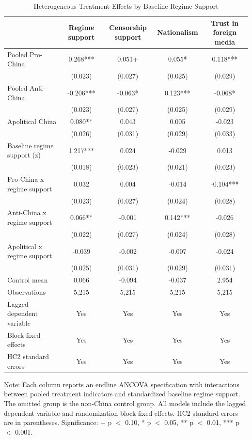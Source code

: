 \begin{table}[H]
\centering
\caption{Heterogeneous Treatment Effects by Baseline Regime Support}
\label{tab:het_rs_t1}
\footnotesize
\begin{threeparttable}
\begin{tabular}{lcccc}
\toprule
 & Regime support & Censorship support & Nationalism & Trust in foreign media \\
\midrule
Pooled Pro-China & 0.268*** & 0.051+ & 0.055* & 0.118*** \\
 & (0.023) & (0.027) & (0.025) & (0.029) \\
\addlinespace
Pooled Anti-China & -0.206*** & -0.063* & 0.123*** & -0.068* \\
 & (0.023) & (0.027) & (0.025) & (0.029) \\
\addlinespace
Apolitical China & 0.080** & 0.043 & 0.005 & -0.023 \\
 & (0.026) & (0.031) & (0.029) & (0.033) \\
\addlinespace
Baseline regime support (z) & 1.217*** & 0.024 & -0.029 & 0.013 \\
 & (0.018) & (0.023) & (0.021) & (0.023) \\
\addlinespace
Pro-China x regime support & 0.032 & 0.004 & -0.014 & -0.104*** \\
 & (0.023) & (0.027) & (0.024) & (0.028) \\
\addlinespace
Anti-China x regime support & 0.066** & -0.001 & 0.142*** & -0.026 \\
 & (0.022) & (0.027) & (0.024) & (0.028) \\
\addlinespace
Apolitical x regime support & -0.039 & -0.002 & -0.007 & -0.024 \\
 & (0.025) & (0.031) & (0.029) & (0.031) \\
\addlinespace
\midrule
Control mean & 0.066 & -0.094 & -0.037 & 2.954 \\
Observations & 5,215 & 5,215 & 5,215 & 5,215 \\
Lagged dependent variable & Yes & Yes & Yes & Yes \\
Block fixed effects & Yes & Yes & Yes & Yes \\
HC2 standard errors & Yes & Yes & Yes & Yes \\
\bottomrule
\end{tabular}
\begin{tablenotes}[flushleft]
\footnotesize
\item Note: Each column reports an endline ANCOVA specification with interactions between pooled treatment indicators and standardized baseline regime support. The omitted group is the non-China control group. All models include the lagged dependent variable and randomization-block fixed effects. HC2 standard errors are in parentheses. Significance: + p $<$ 0.10, * p $<$ 0.05, ** p $<$ 0.01, *** p $<$ 0.001.
\end{tablenotes}
\end{threeparttable}
\end{table}
